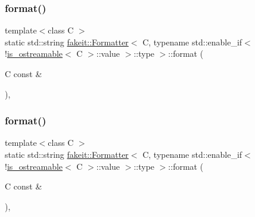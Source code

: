 \subsubsection{\texorpdfstring{format()}{format()}\hspace{0.1cm}{\footnotesize\ttfamily [5/9]}}
{\footnotesize\ttfamily template$<$class C $>$ \\
static std\+::string \mbox{\hyperlink{structfakeit_1_1Formatter}{fakeit\+::\+Formatter}}$<$ C, typename std\+::enable\+\_\+if$<$!\mbox{\hyperlink{classfakeit_1_1is__ostreamable}{is\+\_\+ostreamable}}$<$ C $>$\+::value $>$\+::type $>$\+::format (\begin{DoxyParamCaption}\item[{C const \&}]{ }\end{DoxyParamCaption})\hspace{0.3cm}{\ttfamily [inline]}, {\ttfamily [static]}}

\mbox{\label{structfakeit_1_1Formatter_3_01C_00_01typename_01std_1_1enable__if_3_9is__ostreamable_3_01C_01_4_1_1value_01_4_1_1type_01_4_a4dba58e2321b020a9ac60d5e132afbb0}} 
\subsubsection{\texorpdfstring{format()}{format()}\hspace{0.1cm}{\footnotesize\ttfamily [6/9]}}
{\footnotesize\ttfamily template$<$class C $>$ \\
static std\+::string \mbox{\hyperlink{structfakeit_1_1Formatter}{fakeit\+::\+Formatter}}$<$ C, typename std\+::enable\+\_\+if$<$!\mbox{\hyperlink{classfakeit_1_1is__ostreamable}{is\+\_\+ostreamable}}$<$ C $>$\+::value $>$\+::type $>$\+::format (\begin{DoxyParamCaption}\item[{C const \&}]{ }\end{DoxyParamCaption})\hspace{0.3cm}{\ttfamily [inline]}, {\ttfamily [static]}}

